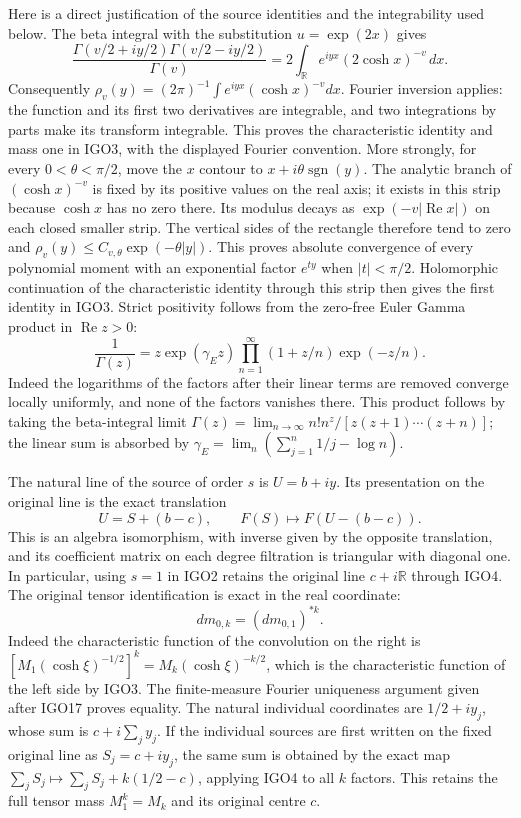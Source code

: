 \documentclass[11pt,a4paper]{article}
\begin{document}
Here is a direct justification of the source identities and the
integrability used below. The beta integral with the substitution
$u=\exp(2x)$ gives
\[
 \frac{\Gamma(v/2+iy/2)\Gamma(v/2-iy/2)}{\Gamma(v)}
  =2\int_{\mathbb R} e^{iyx}(2\cosh x)^{-v}\,dx.
\]
Consequently $\rho_v(y)=(2\pi)^{-1}
\int e^{iyx}(\cosh x)^{-v}dx$. Fourier inversion applies: the
function and its first two derivatives are integrable, and two
integrations by parts make its transform integrable. This proves
the characteristic identity and mass one in IGO3, with the displayed
Fourier convention. More strongly, for every $0<\theta<\pi/2$, move
the $x$ contour to $x+i\theta\operatorname{sgn}(y)$. The analytic
branch of $(\cosh x)^{-v}$ is fixed by its positive values on the
real axis; it exists in this strip because $\cosh x$ has no zero
there. Its modulus decays as $\exp(-v|\operatorname{Re}x|)$ on
each closed smaller strip. The vertical sides of the rectangle
therefore tend to zero and
$\rho_v(y)\leq C_{v,\theta}\exp(-\theta|y|)$.
This proves absolute convergence of every polynomial moment with
an exponential factor $e^{ty}$ when $|t|<\pi/2$. Holomorphic
continuation of the characteristic identity through this strip
then gives the first identity in IGO3. Strict positivity follows
from the zero-free Euler Gamma product in $\operatorname{Re}z>0$:
\[
 \frac1{\Gamma(z)}=z\exp(\gamma_{\!E}z)
       \prod_{n=1}^{\infty}(1+z/n)\exp(-z/n).
\]
Indeed the logarithms of the factors after their linear terms are
removed converge locally uniformly, and none of the factors vanishes
there. This product follows by taking the beta-integral limit
$\Gamma(z)=\lim_{n\to\infty}n!n^z/[z(z+1)\cdots(z+n)]$;
the linear sum is absorbed by
$\gamma_{\!E}=\lim_n(\sum_{j=1}^n1/j-\log n)$.

The natural line of the source of order $s$ is $U=b+iy$.
Its presentation on the original line is the exact translation
\[
 U=S+(b-c),\qquad
 F(S)\longmapsto F(U-(b-c)).
 \tag{IGO4}
\]
This is an algebra isomorphism, with inverse given by the opposite
translation, and its coefficient matrix on each degree filtration
is triangular with diagonal one. In particular, using $s=1$ in
IGO2 retains the original line $c+i\mathbb R$ through IGO4.
The original tensor identification is exact in the real coordinate:
\[
 dm_{0,k}=(dm_{0,1})^{*k}.
\]
Indeed the characteristic function of the convolution on the right
is $[M_1(\cosh\xi)^{-1/2}]^k
=M_k(\cosh\xi)^{-k/2}$, which is the characteristic function
of the left side by IGO3. The finite-measure Fourier uniqueness
argument given after IGO17 proves equality. The natural individual
coordinates are $1/2+iy_j$, whose sum is $c+i\sum_jy_j$.
If the individual sources are first written on the fixed original
line as $S_j=c+iy_j$, the same sum is obtained by the exact map
$\sum_jS_j\mapsto\sum_jS_j+k(1/2-c)$, applying IGO4 to all
$k$ factors. This retains the full tensor mass $M_1^k=M_k$
and its original centre $c$.
\end{document}
